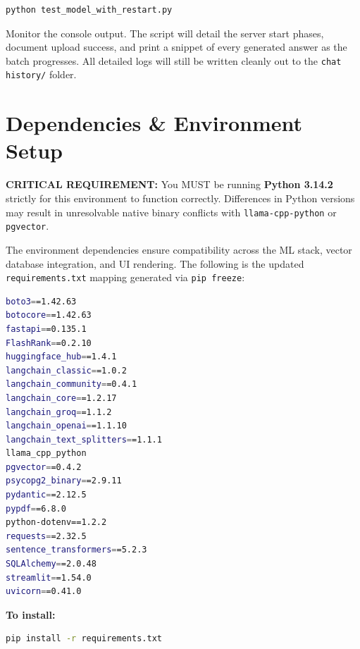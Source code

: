 \documentclass[11pt, a4paper]{article}
\begin{document}
\begin{lstlisting}[language=bash, caption=Running the Evaluation Suite]
python test_model_with_restart.py
\end{lstlisting}

Monitor the console output. The script will detail the server start phases, document upload success, and print a snippet of every generated answer as the batch progresses. All detailed logs will still be written cleanly out to the \texttt{chat history/} folder.

\section{Dependencies \& Environment Setup}

\textbf{CRITICAL REQUIREMENT:} You MUST be running \textbf{Python 3.14.2} strictly for this environment to function correctly. Differences in Python versions may result in unresolvable native binary conflicts with \texttt{llama-cpp-python} or \texttt{pgvector}.

The environment dependencies ensure compatibility across the ML stack, vector database integration, and UI rendering. The following is the updated \texttt{requirements.txt} mapping generated via \texttt{pip freeze}:

\begin{lstlisting}[language=bash, caption=requirements.txt details]
boto3==1.42.63
botocore==1.42.63
fastapi==0.135.1
FlashRank==0.2.10
huggingface_hub==1.4.1
langchain_classic==1.0.2
langchain_community==0.4.1
langchain_core==1.2.17
langchain_groq==1.1.2
langchain_openai==1.1.10
langchain_text_splitters==1.1.1
llama_cpp_python
pgvector==0.4.2
psycopg2_binary==2.9.11
pydantic==2.12.5
pypdf==6.8.0
python-dotenv==1.2.2
requests==2.32.5
sentence_transformers==5.2.3
SQLAlchemy==2.0.48
streamlit==1.54.0
uvicorn==0.41.0
\end{lstlisting}

\textbf{To install:}
\begin{lstlisting}[language=bash]
pip install -r requirements.txt
\end{lstlisting}
\end{document}
